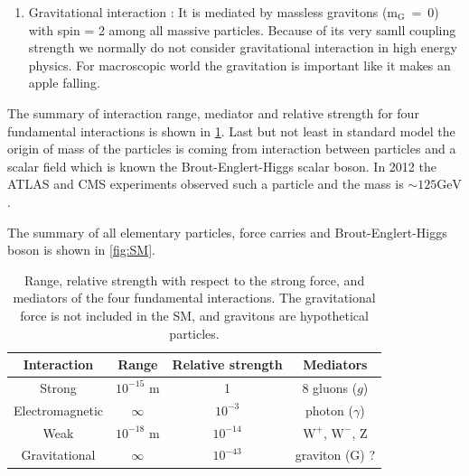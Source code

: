 \begin{enumerate}
\item Gravitational interaction : It is mediated by massless gravitons ($\mathrm{m_{G}~=~0}$) with spin = 2 among all massive particles. Because of its very samll coupling strength we normally do not consider gravitational interaction in high energy physics. For macroscopic world the gravitation is important like it makes an apple falling.
\end{enumerate}

The summary of interaction range, mediator and relative strength for four fundamental interactions is shown in \ref{tab:interactions}.
Last but not least in standard model the origin of mass of the particles is coming from interaction between particles and a scalar field which is known the Brout-Englert-Higgs scalar boson. In 2012 the ATLAS \cite{Aad:2012tfa} and CMS \cite{Chatrchyan:2012xdj} experiments observed such a particle and the mass is $\sim \mathrm{125 GeV}$.

The summary of all elementary particles, force carries and Brout-Englert-Higgs boson is shown in \ref{fig:SM}.

 \begin{table}[!hbpt]
 \begin{center}
 \begin{tabular}{|c|c|c|c|}
 \hline
 Interaction & Range & Relative strength & Mediators \\
 \hline
 Strong & $10^{-15}$ m & 1 &  8 gluons ($g$) \\
 \hline
 Electromagnetic & $\infty$ & $10^{-3}$ & photon ($\gamma$) \\
 \hline
 Weak &  $10^{-18}$ m & $10^{-14}$ & $\mathrm{W^+}$, $\mathrm{W^-}$, $\mathrm{Z}$ \\
 \hline
 Gravitational & $\infty$ & $10^{-43}$ & graviton (G) ? \\
 \hline
  \end{tabular}
 \end{center}
 \caption{Range, relative strength with respect to the strong force, and mediators of the four fundamental interactions. The gravitational force is not included in the SM, and gravitons are hypothetical particles.
 \label{tab:interactions}
}
 \end{table}

